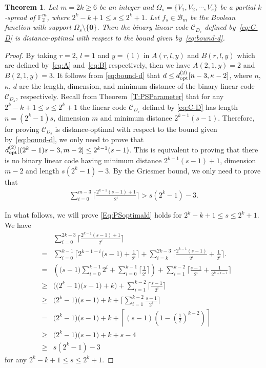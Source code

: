\documentclass[10pt]{article}
\newtheorem{theorem}{Theorem}
\newcommand{\F}{\mathbb{F}}
\newcommand{\0}{\textbf{0}}
\newcommand{\1}{\textbf{1}}
\newcommand{\C}{{\mathcal C}}
\begin{document}
{\color{red}

\begin{theorem}\label{T:BoundPS-d}
Let $m=2k\geq 6$ be an integer and $\Omega_s=\{V_1,V_2,\cdots,V_s\}$ be a partial $k$-spread of $\F_2^m$,
where $2^k-k+1\leq s\leq 2^k+1$.
Let $f_s\in\mathcal{B}_{m}$ be the Boolean function with support $\Omega_s\setminus\{\0\}$.
Then the binary linear code $\C_{D_s}$ defined by~\eqref{eq:C-D} is distance-optimal with respect to the bound given by~\eqref{eq:bound-d}.
\end{theorem}
\begin{proof}
By taking $r=2$, $l=1$ and $y=(1)$ in $A(r, l, y)$ and $B(r, l, y)$ which are defined by~\eqref{eq:A} and~\eqref{eq:B} respectively,
then we have $A(2, 1, y)=2$ and  $B(2, 1, y)=3$.
It follows from \eqref{eq:bound-d} that $d\leq d_{{\rm opt }}^{(2)}[n-3, \kappa-2]$,
where $n$, $\kappa$, $d$ are the length, dimension, and minimum distance of the binary linear code  $\C_{D_s}$, respectively.
Recall from Theorem~\ref{T:PSParameter} that for any $2^k-k+1\leq s\leq 2^k+1$ the linear code $\C_{D_s}$ defined by \eqref{eq:C-D} has
length $n=(2^k-1)s$, dimension $m$ and minimum distance $2^{k-1}(s-1)$.
Therefore, for proving $\C_{D_s}$ is distance-optimal with respect to the bound given by~\eqref{eq:bound-d},
we only need to prove that $d_{\rm opt}^{(2)}[(2^k-1)s-3, m-2]\leq 2^{k-1}(s-1)$.
This is equivalent to proving that there is no binary linear code having minimum distance $2^{k-1}(s-1)+1$, dimension $m-2$
and length $s(2^k-1)-3$. By the Griesmer bound, we only need to prove that
\begin{eqnarray}\label{Eq:PSoptimald}
\sum_{i=0}^{m-3}\bigg\lceil\frac{2^{k-1}(s-1)+1}{2^i}\bigg\rceil > s(2^k-1)-3.
\end{eqnarray}

In what follows, we will prove \eqref{Eq:PSoptimald} holds for  $2^k-k+1\leq s\leq 2^k+1$.
We have
\begin{eqnarray*}
&&\sum_{i=0}^{2k-3}\bigg\lceil\frac{2^{k-1}(s-1)+1}{2^i}\bigg\rceil\\
&=&\sum_{i=0}^{k-1}\Big\lceil2^{k-1-i}\big(s-1\big)+\frac{1}{2^{i}}\Big\rceil+\sum_{i=k}^{2k-3}\bigg\lceil\frac{2^{k-1}(s-1)}{2^i}+\frac{1}{2^i}\bigg\rceil.\\
&=&\left(\big(s-1\big)\sum_{i=0}^{k-1}2^i+\sum_{i=0}^{k-1}\Big\lceil\frac{1}{2^{i}}\Big\rceil\right)+\sum_{i=1}^{k-2}\bigg\lceil\frac{s-1}{2^i}+\frac{1}{2^{k+i-1}}\bigg\rceil\\
&\geq &\bigg(\big(2^k-1)\big(s-1\big)+k\bigg)+\sum_{i=1}^{k-2}\bigg\lceil\frac{s-1}{2^i}\bigg\rceil\\
&\geq &\big(2^k-1)\big(s-1\big)+k+\bigg\lceil\sum_{i=1}^{k-2}\frac{s-1}{2^i}\bigg\rceil\\
&= &\big(2^k-1)\big(s-1\big)+k+\left\lceil\left(s-1\right)\left(1-\left(\frac{1}{2}\right)^{k-2}\right)\right\rceil\\
&\geq &\big(2^k-1)\big(s-1\big)+k+s-4\\
&\geq&s(2^k-1)-3
\end{eqnarray*}
for any $2^k-k+1\leq s\leq 2^k+1$.


\end{proof}}
\end{document}
